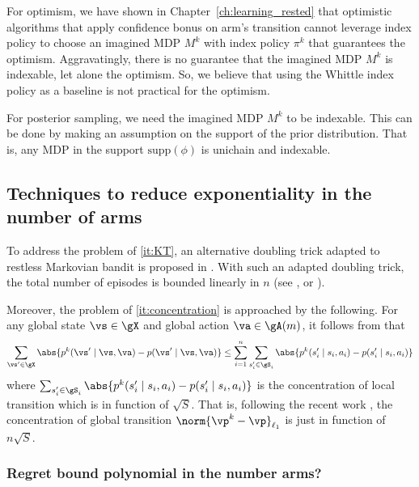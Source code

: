 For optimism, we have shown in Chapter~\ref{ch:learning_rested} that optimistic algorithms that apply confidence bonus on arm's transition cannot leverage index policy to choose an imagined MDP $M^k$ with index policy $\pi^k$ that guarantees the optimism.
Aggravatingly, there is no guarantee that the imagined MDP $M^k$ is indexable, let alone the optimism.
So, we believe that using the Whittle index policy as a baseline is not practical for the optimism.

For posterior sampling, we need the imagined MDP $M^k$ to be indexable.
This can be done by making an assumption on the support of the prior distribution.
That is, any MDP in the support $\mathrm{supp}(\phi)$ is unichain and indexable.

\subsection{Techniques to reduce exponentiality in the number of arms}

To address the problem of \ref{it:KT}, an alternative doubling trick adapted to restless Markovian bandit is proposed in \cite{ortner2012regret, jung2019thompson, akbarzadeh2022learning}.
With such an adapted doubling trick, the total number of episodes is bounded linearly in $n$ (see \eg, \cite[Lemma~A.1]{akbarzadeh2022learning} or \cite[Lemma~8]{jung2019thompson}).

Moreover, the problem of \ref{it:concentration} is approached by the following.
For any global state $\vs\in\gX$ and global action $\va\in\gA(m)$, it follows from \cite[Lemma~13]{jung2019thompson} that
\begin{align*}
    \sum_{\vs'\in\gX} \abs{p^k(\vs'\mid \vs,\va) -p(\vs'\mid \vs,\va)}
    \le \sum_{i=1}^{n} \sum_{s'_i\in\gS_i} \abs{p^k(s'_i\mid s_i,a_i) -p(s'_i\mid s_i,a_i)}
\end{align*}
where $\sum_{s'_i\in\gS_i} \abs{p^k(s'_i\mid s_i,a_i) -p(s'_i\mid s_i,a_i)}$ is the concentration of local transition which is in function of $\sqrt{S}$.
That is, following the recent work \cite{ortner2012regret, jung2019thompson, akbarzadeh2022learning}, the concentration of global transition $\norm{\vp^k-\vp}_{\ell_1}$ is just in function of $n\sqrt{S}$.

\subsubsection*{Regret bound polynomial in the number arms?}

